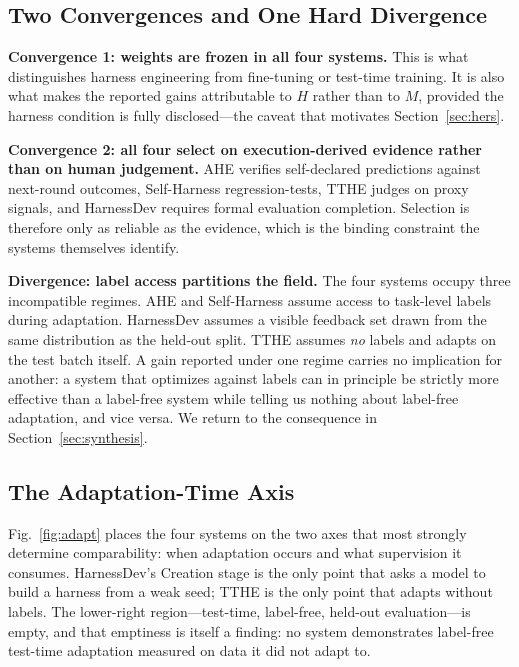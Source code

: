 \documentclass[conference]{IEEEtran}
\begin{document}
\subsection{Two Convergences and One Hard Divergence}

\textbf{Convergence 1: weights are frozen in all four systems.} This is what distinguishes harness engineering from fine-tuning or test-time training. It is also what makes the reported gains attributable to $H$ rather than to $M$, provided the harness condition is fully disclosed---the caveat that motivates Section~\ref{sec:hers}.

\textbf{Convergence 2: all four select on execution-derived evidence rather than on human judgement.} AHE verifies self-declared predictions against next-round outcomes, Self-Harness regression-tests, TTHE judges on proxy signals, and HarnessDev requires formal evaluation completion. Selection is therefore only as reliable as the evidence, which is the binding constraint the systems themselves identify.

\textbf{Divergence: label access partitions the field.} The four systems occupy three incompatible regimes. AHE and Self-Harness assume access to task-level labels during adaptation. HarnessDev assumes a visible feedback set drawn from the same distribution as the held-out split. TTHE assumes \emph{no} labels and adapts on the test batch itself. A gain reported under one regime carries no implication for another: a system that optimizes against labels can in principle be strictly more effective than a label-free system while telling us nothing about label-free adaptation, and vice versa. We return to the consequence in Section~\ref{sec:synthesis}.

\subsection{The Adaptation-Time Axis}

Fig.~\ref{fig:adapt} places the four systems on the two axes that most strongly determine comparability: when adaptation occurs and what supervision it consumes. HarnessDev's Creation stage is the only point that asks a model to build a harness from a weak seed; TTHE is the only point that adapts without labels. The lower-right region---test-time, label-free, held-out evaluation---is empty, and that emptiness is itself a finding: no system demonstrates label-free test-time adaptation measured on data it did not adapt to.
\end{document}
